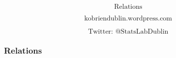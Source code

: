 \documentclass{beamer}
\begin{document}
\begin{frame}
\Large
\[ \mbox{Relations}  \]

\Large
\[ \mbox{kobriendublin.wordpress.com}  \]

\Large
\[ \mbox{Twitter: @StatsLabDublin}  \]
\end{frame}
\begin{frame}
\frametitle{Relations}

\end{frame}
\end{document}
